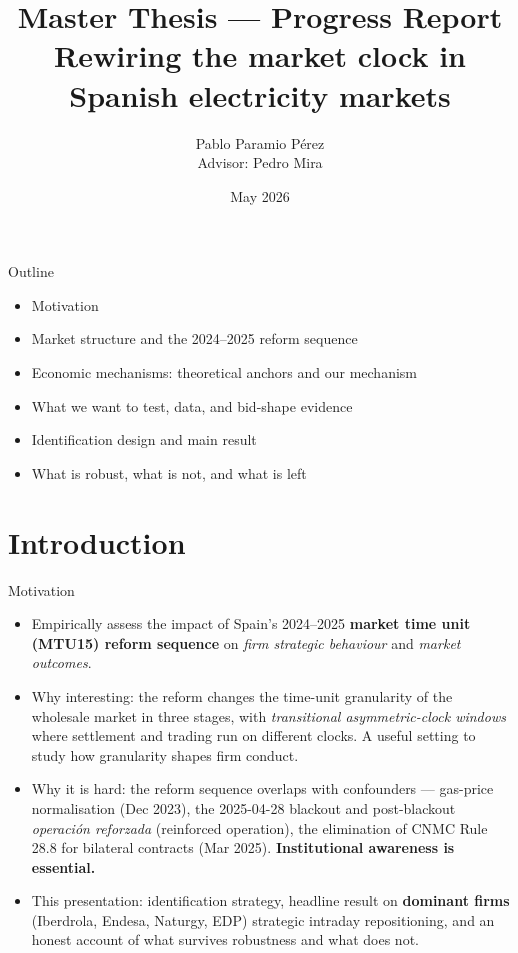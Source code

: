 \documentclass[10pt,aspectratio=169]{beamer}
\title{\textbf{Master Thesis --- Progress Report}\\[2pt]\large Rewiring the market clock in Spanish electricity markets}
\author{Pablo Paramio Pérez \\ \small Advisor: Pedro Mira}
\institute{CEMFI}
\date{May 2026}
\begin{document}
{
\begin{frame}[plain]
  \titlepage
\end{frame}
}

\begin{frame}{Outline}
  \begin{itemize}
    \item Motivation
    \item Market structure and the 2024--2025 reform sequence
    \item Economic mechanisms: theoretical anchors and our mechanism
    \item What we want to test, data, and bid-shape evidence
    \item Identification design and main result
    \item What is robust, what is not, and what is left
  \end{itemize}
\end{frame}

\section{Introduction}

\begin{frame}{Motivation}
  \begin{itemize}
    \item Empirically assess the impact of Spain's 2024--2025 \textbf{market time unit (MTU15) reform sequence} on \emph{firm strategic behaviour} and \emph{market outcomes}.
    \vspace{4pt}
    \item Why interesting: the reform changes the time-unit granularity of the wholesale market in three stages, with \emph{transitional asymmetric-clock windows} where settlement and trading run on different clocks. A useful setting to study how granularity shapes firm conduct.
    \vspace{4pt}
    \item Why it is hard: the reform sequence overlaps with confounders --- gas-price normalisation (Dec 2023), the 2025-04-28 blackout and post-blackout \emph{operación reforzada} (reinforced operation), the elimination of CNMC Rule 28.8 for bilateral contracts (Mar 2025). \textbf{Institutional awareness is essential.}
    \vspace{4pt}
    \item This presentation: identification strategy, headline result on \textbf{dominant firms} (Iberdrola, Endesa, Naturgy, EDP) strategic intraday repositioning, and an honest account of what survives robustness and what does not.
  \end{itemize}
\end{frame}
\end{document}
